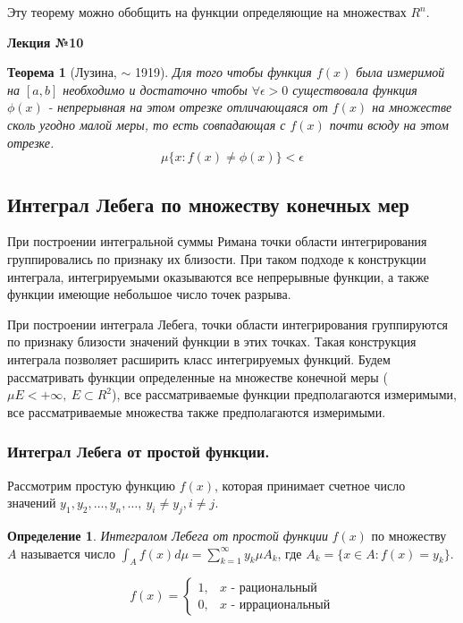\documentclass[14pt,a4paper]{extarticle}
\newtheorem{theorem}{Теорема}[section]
\theoremstyle{definition}
\newtheorem{definition}{Определение}[section]
\theoremstyle{remark}
\renewcommand{\[}{\begin{dmath*}[compact]}
\renewcommand{\]}{\end{dmath*}}
\newcommand{\ds}{\displaystyle}
\newcommand{\sep}{ , \ \allowbreak }
\begin{document}
Эту теорему можно обобщить на функции определяющие на множествах $R^n$.

\textbf{Лекция №10}

\begin{theorem}[Лузина, $\sim$ 1919]
  Для того чтобы функция $f(x)$ была измеримой на $[a,b]$ необходимо и
  достаточно чтобы $\forall \epsilon > 0$ существовала функция $\phi(x)$ -
  непрерывная на этом отрезке отличающаяся от $f(x)$ на множестве
  сколь угодно малой меры, то есть совпадающая с $f(x)$
  почти всюду на этом отрезке.
  \[\mu\{x:f(x) \neq \phi (x)\} < \epsilon\]
\end{theorem}

\subsection{Интеграл Лебега по множеству конечных мер}

При построении интегральной суммы Римана точки области интегрирования
группировались по признаку их близости.
При таком подходе к конструкции интеграла,
интегрируемыми оказываются все непрерывные функции,
а также функции имеющие небольшое число точек разрыва.

При построении интеграла Лебега,
точки области интегрирования группируются по признаку близости
значений функции в этих точках.
Такая конструкция интеграла позволяет расширить класс интегрируемых функций.
Будем рассматривать функции определенные на множестве конечной меры
($\mu E < +\infty \sep E \subset R^2$),
все рассматриваемые функции предполагаются измеримыми,
все рассматриваемые множества также предполагаются измеримыми.

\subsubsection{Интеграл Лебега от простой функции.}

Рассмотрим простую функцию $f(x)$, которая принимает
счетное число значений
$y_1, y_2, \dots, y_n, \dots \sep y_i \neq y_j, i \neq j$.

\begin{definition}
  \textit{Интегралом Лебега от простой функции} $f(x)$ по множеству $A$
  называется число $\ds\int_A f(x) d\mu = \sum_{k=1}^\infty y_k\mu A_k$,
  где $A_k=\{x\in A:f(x)=y_k\}$.
\end{definition}

\[f(x) = \begin{cases}
  1, & x\text{ - рациональный} \\
  0, & x\text{ - иррациональный}
\end{cases}\]
\end{document}
